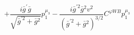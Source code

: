 %
\begin{dmath*}
%
  +  \frac{i {\bar g}^\prime {\bar g}{}}{\sqrt{{\bar g}^{\prime 2} + {\bar g}{}^2}}p_1^{\mu_3}  -  \frac{i {\bar g}^{\prime 2} {\bar g}{}^2 v^2}{\left({\bar g}^{\prime 2} + {\bar g}{}^2\right)^{3/2}}C^{ \varphi  WB} p_1^{\mu_3}
%
\end{dmath*}
%
